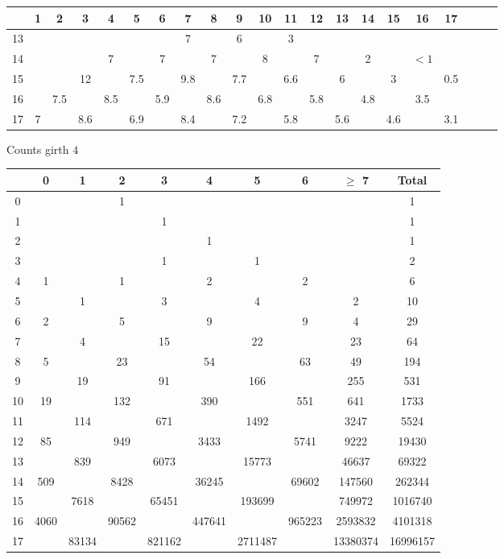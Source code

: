 \noindent\begin{tabular}{|c|c|c|c|c|c|c|c|c|c|c|c|c|c|c|c|c|c|c|c|c|}
    \hline
    & 1 & 2 & 3 & 4 & 5 & 6 & 7 & 8 & 9 & 10 & 11 & 12 & 13 & 14 & 15 & 16 & 17 \\ \hline
    13 & & & & & & & 7 & & 6 & & 3 & & & & & & \\ \hline
    14 & & & & 7 & & 7 & & 7 & & 8 & & 7 & & 2 & & $< 1$ & \\ \hline
    15 & & & 12 & & 7.5 & & 9.8 & & 7.7 & & 6.6 & & 6 & & 3 & & 0.5 \\ \hline
    16 & & 7.5 & & 8.5 & & 5.9 & & 8.6 & & 6.8 & & 5.8 & & 4.8 & & 3.5 & \\ \hline
    17 & 7 & & 8.6 & & 6.9 & & 8.4 & & 7.2 & & 5.8 & & 5.6 & & 4.6 & & 3.1\\ \hline
\end{tabular}

\noindent Counts girth $4$

\noindent\begin{tabular}{|c|c|c|c|c|c|c|c|c|c|}
    \hline
    & 0 & 1 & 2 & 3 & 4 & 5 & 6 & $\geq$ 7 & Total\\ \hline
    0 & & & 1 & & & & & & 1 \\ \hline
    1 & & & & 1 & & & & & 1 \\ \hline    
    2 & & & & & 1 & & & & 1 \\ \hline
    3 & & & & 1 & & 1 & & & 2 \\ \hline
    4 & 1 & & 1 & & 2 & & 2 & & 6 \\ \hline
    5 & & 1 & & 3 & & 4 & & 2 & 10 \\ \hline
    6 & 2 & & 5 & & 9 & & 9 & 4 & 29 \\ \hline
    7 & & 4 & & 15 & & 22 & & 23 & 64 \\ \hline
    8 & 5 & & 23 & & 54 & & 63 & 49 & 194\\ \hline
    9 & & 19 & & 91 & & 166 & & 255 & 531\\ \hline
    10 & 19 & & 132 & & 390 & & 551 & 641 & 1733\\ \hline
    11 & & 114 & & 671 & & 1492 & & 3247 & 5524\\ \hline
    12 & 85 & & 949 & & 3433 & & 5741 & 9222 & 19430 \\ \hline
    13 & & 839 & & 6073 & & 15773 & & 46637 & 69322\\ \hline
    14 & 509 & & 8428 & & 36245 & & 69602 & 147560 & 262344\\ \hline
    15 & & 7618 & & 65451 & & 193699 & & 749972 & 1016740\\ \hline
    16 & 4060 & & 90562 & & 447641 & & 965223 & 2593832 & 4101318 \\ \hline
    17 & & 83134 & & 821162 & & 2711487 & & 13380374 & 16996157\\ \hline
\end{tabular}


